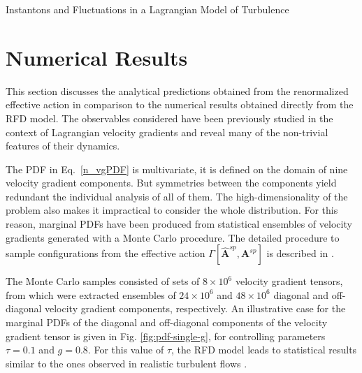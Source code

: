\begin{chapter}{Instantons and Fluctuations in a Lagrangian Model of Turbulence}

\section{Numerical Results} 
\label{sec:Results}

This section discusses the analytical predictions obtained from the renormalized effective action in comparison to the numerical results obtained directly from the RFD model. The observables considered have been previously studied in the context of Lagrangian velocity gradients and reveal many of the non-trivial features of their dynamics.


The PDF in Eq.~\ref{n_vgPDF} is multivariate, it is defined on the domain of nine velocity gradient components. But symmetries between the components yield redundant the individual analysis of all of them. The high-dimensionality of the problem also makes it impractical to consider the whole distribution. For this reason, marginal PDFs have been produced from statistical ensembles of velocity gradients generated with a Monte Carlo procedure. The detailed procedure to sample configurations from the effective action $\Gamma[\hat {\mathbf{A}}^{sp}, {\mathbf{A}}^{sp} ]$ is described in \textcite{moriconi2014}.

The Monte Carlo samples consisted of sets of $ 8 \times 10^6$ velocity gradient tensors, from which were extracted ensembles of $ 24 \times 10^6$ and $ 48 \times 10^6$ diagonal and off-diagonal velocity gradient components, respectively. An illustrative case for the marginal PDFs of the diagonal and off-diagonal components of the velocity gradient tensor is given in Fig. \ref{fig:pdf-single-g}, for controlling parameters $\tau=0.1$ and $g=0.8$.
For this value of $\tau$, the RFD model leads to statistical results similar to the ones observed in realistic turbulent flows \parencite{ChevPRL}.


\end{chapter}
